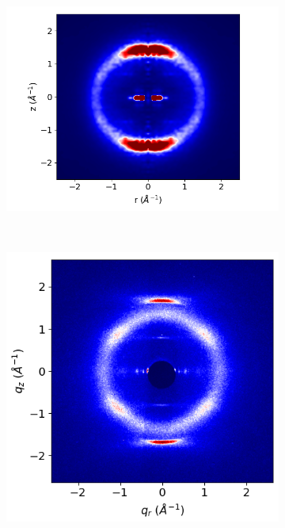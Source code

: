 \documentclass[journal=jpcbfk,manusciprt=article]{achemso}
\begin{document}
  \begin{figure}
  \begin{subfigure}{0.3\linewidth}
        \centering
        \vspace{-0.2em}
        \includegraphics[width=1.1\linewidth,trim={1cm 0 1.3cm 0},clip]{offset_rzplot.png}
        \caption{}~\label{fig:rz_offset}
  \end{subfigure}
  \begin{subfigure}{0.3\linewidth}
        \centering
        \includegraphics[scale=0.285]{WAXS_raw.png}

\end{subfigure}
\end{figure}
\end{document}

